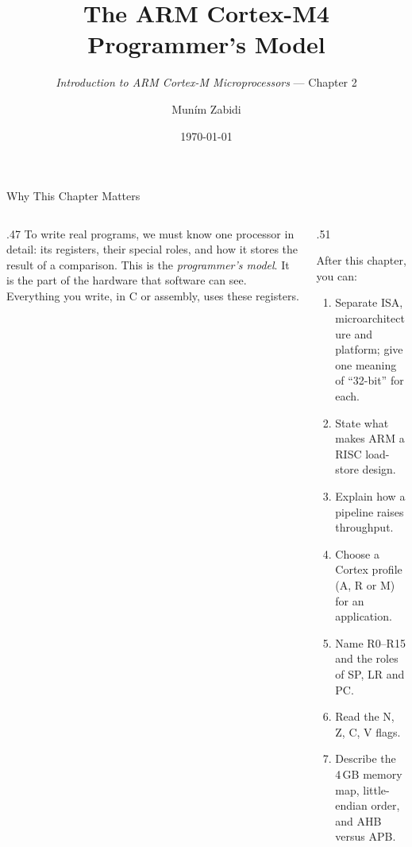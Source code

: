 \documentclass[9pt,aspectratio=169,xcolor=table]{beamer}
\title{The ARM Cortex-M4 Programmer's Model}
\subtitle{\emph{Introduction to ARM Cortex-M Microprocessors} --- Chapter 2}
\author{Mun\'{i}m Zabidi}
\institute{\color{primary}Faculty of Electrical Engineering, Universiti Teknologi Malaysia}
\date{\today}
\begin{document}
\titlepage
\begin{frame}{Why This Chapter Matters}
    \begin{columns}[T]
    \begin{column}{.47\textwidth}
        {\normalsize To write real programs, we must know one processor in detail: its registers, their special roles, and how it stores the result of a comparison. This is the \emph{programmer's model}. It is the part of the hardware that software can see. Everything you write, in C or assembly, uses these registers.}
    \end{column}
    \begin{column}{.51\textwidth}
        \begin{block}{After this chapter, you can:}
        {\small
        \begin{enumerate}\itemsep2pt
            \item Separate ISA, microarchitecture and platform; give one meaning of ``32-bit'' for each.
            \item State what makes ARM a RISC load-store design.
            \item Explain how a pipeline raises throughput.
            \item Choose a Cortex profile (A, R or M) for an application.
            \item Name R0--R15 and the roles of SP, LR and PC.
            \item Read the N, Z, C, V flags.
            \item Describe the 4\,GB memory map, little-endian order, and AHB versus APB.
        \end{enumerate}}
        \end{block}
    \end{column}
    \end{columns}
\end{frame}
\end{document}
